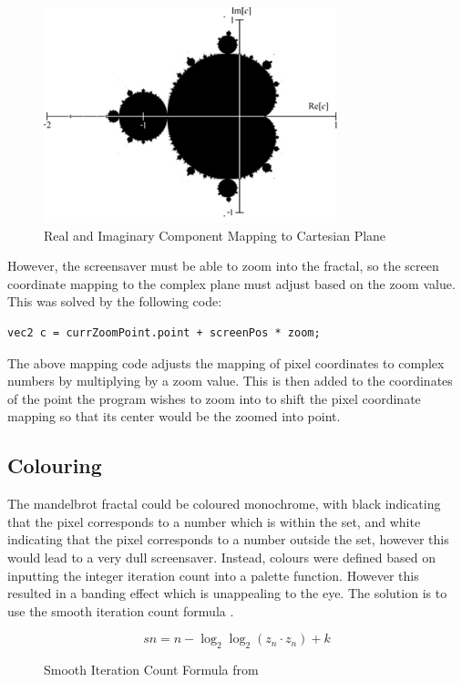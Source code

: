 \documentclass[10pt, openany]{book}
\begin{document}
\begin{figure}[H]
	\centering
	\includegraphics[width=0.4\linewidth]{MandelbrotAxis}
	\caption{Real and Imaginary Component Mapping to Cartesian Plane}
	\label{fig:mandelbrot-axis}
\end{figure}	

However, the screensaver must be able to zoom into the fractal, so the screen coordinate mapping to the complex plane must adjust based on the zoom value. This was solved by the following code:

\begin{verbatim}
vec2 c = currZoomPoint.point + screenPos * zoom;
\end{verbatim}

The above mapping code adjusts the mapping of pixel coordinates to complex numbers by multiplying by a zoom value. This is then added to the coordinates of the point the program wishes to zoom into to shift the pixel coordinate mapping so that its center would be the zoomed into point.

\subsection{Colouring}

The mandelbrot fractal could be coloured monochrome, with black indicating that the pixel corresponds to a number which is within the set, and white indicating that the pixel corresponds to a number outside the set, however this would lead to a very dull screensaver. Instead, colours were defined based on inputting the integer iteration count into a palette function. However this resulted in a banding effect which is unappealing to the eye. The solution is to use the smooth iteration count formula \citep{quilez-smooth}.

\begin{figure}[H]
	\centering
	\[ sn = n - \log_2\log_2(z_n \cdot z_n) + k \]
	\caption{Smooth Iteration Count Formula from \citep{quilez-smooth}}
	\label{fig:smooth-iter}
\end{figure}
\end{document}
